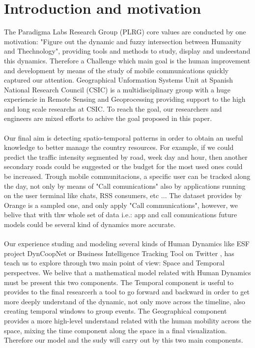 \newpage
\setcounter{secnumdepth}{1}
\section{Introduction and motivation}
The Paradigma Labs Research Group (PLRG) core values are conducted by one motivation: "Figure out the dynamic and fuzzy intersection between Humanity and Thechnology", providing tools and methods to study, display and undeestand this dynamics.  Therefore a Challenge which main goal is the human improvement and development by means of the study of mobile communications quickly captured our attention. Geographical Unformation Systems Unit at Spanish National Research Council  (CSIC) is a multidisciplinary group with a huge experiencie in Remote Sensing and Geoprocessing providing support to the high and long scale researchs at CSIC. To reach the goal, our researchers and engineers are mixed efforts to achive the goal proposed in this paper.
\\
\\
Our final aim is detecting spatio-temporal patterns in order to obtain an useful knowledge to better manage the country resources. For example, if we could predict the traffic intensity segmented by road, week day and hour, then another secondary roads could be suggested or the budget for the most used ones could be increased. Trough mobile communitacions, a specific user can be tracked along the day, not only by means of "Call comunications" also by applications running on the user terminal like chats, RSS consumers, etc ... The dataset provides by Orange is a sampled one, and only apply "Call communications", however, we belive that with thw whole set of data i.e.: app and call comunications future models could be several kind of dynamics more accurate.
\\
\\
Our experience studing and modeling several kinds of Human Dynamics like ESF project DynCoopNet\citep{dyncoopnet2012} or Business Intelligence Tracking Tool on Twitter \citep{labselecciones}, has teach us to explore through two main point of view: Space and Temporal perspectves. We belive that a mathematical model related with Human Dynamics must be present this two components. The Temporal component is useful to provides to the final researcerh a tool to go forward and backward in order to get more deeply understand of the dynamic, not only move across the timeline, also creating temporal windows to group events. The Geographical component provides a more high-level understand related with the human mobility across the space, mixing the time component along the space in a final visualization. Therefore our model and the sudy will carry out by this two main components.
